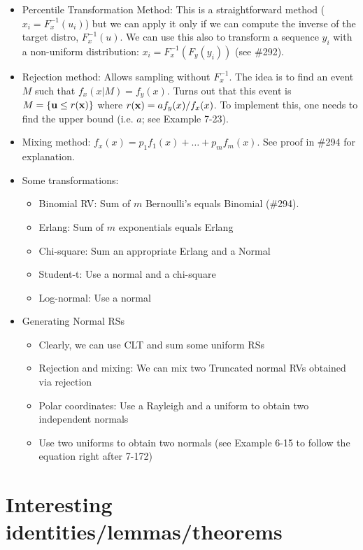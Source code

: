\documentclass[a4paper, oneside]{book}
\begin{document}
\begin{itemize}
\begin{itemize}
	\item Percentile Transformation Method: This is a straightforward method ($x_i=F^{-1}_x(u_i)$) but we can apply it only if we can compute the inverse of the target distro, $F^{-1}_x(u)$. We can use this also to transform a sequence $y_i$ with a non-uniform distribution: $x_i=F_x^{-1}\left(F_y(y_i)\right)$ (see \#292).
	\item Rejection method: Allows sampling without $F^{-1}_x$. The idea is to find an event $M$ such that $f_x(x|M) = f_y(x)$. Turns out that this event is $M=\{\mathbf{u}\leq r(\mathbf{x})\}$ where $r(\mathbf{x}) = a f_y(x)/f_x(x)$. To implement this, one needs to find the upper bound (i.e. $a$; see Example 7-23). 
	\item Mixing method: $f_x(x) = p_1 f_1(x)+\hdots+p_m f_m(x)$. See proof in \#294 for explanation. 
	\item Some transformations:
		\begin{itemize}
		\item Binomial RV: Sum of $m$ \iid Bernoulli's equals Binomial (\#294).
		\item Erlang: Sum of $m$ \iid exponentials equals Erlang
		\item Chi-square: Sum an appropriate Erlang and a Normal
		\item Student-t: Use a normal and a chi-square
		\item Log-normal: Use a normal
		\end{itemize}
	\item Generating Normal RSs
		\begin{itemize}
		\item Clearly, we can use CLT and sum some uniform RSs
		\item Rejection and mixing: We can mix two Truncated normal RVs obtained via rejection
		\item Polar coordinates: Use a Rayleigh and a uniform to obtain two independent normals
		\item Use two uniforms to obtain two normals (see Example 6-15 to follow the equation right after 7-172)
		\end{itemize}
	\end{itemize}
\end{itemize}

\section{Interesting identities/lemmas/theorems}
\end{document}

